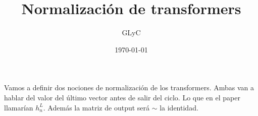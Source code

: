 \documentclass{article}
\title{Normalización de transformers}
\author{GLyC}
\date{\today}
\begin{document}
\maketitle

Vamos a definir dos nociones de normalización de los transformers. Ambas van a hablar del valor del último vector antes de salir del ciclo. Lo que en el paper llamarían $h_n^L$. Además la matriz de output será $\sim$ la identidad.






\end{document}
